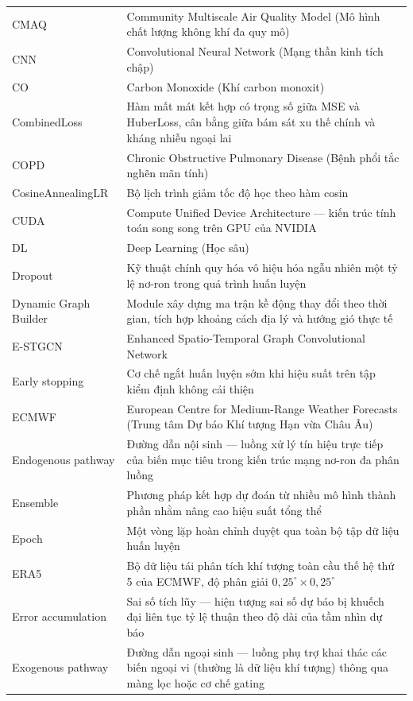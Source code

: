 \begin{longtable}{p{4.2cm} p{10.3cm}}
    CMAQ & Community Multiscale Air Quality Model (Mô hình chất lượng không khí đa quy mô) \\
    CNN & Convolutional Neural Network (Mạng thần kinh tích chập) \\
    CO & Carbon Monoxide (Khí carbon monoxit) \\
    CombinedLoss & Hàm mất mát kết hợp có trọng số giữa MSE và HuberLoss, cân bằng giữa bám sát xu thế chính và kháng nhiễu ngoại lai \\
    COPD & Chronic Obstructive Pulmonary Disease (Bệnh phổi tắc nghẽn mãn tính) \\
    CosineAnnealingLR & Bộ lịch trình giảm tốc độ học theo hàm cosin \\
    CUDA & Compute Unified Device Architecture --- kiến trúc tính toán song song trên GPU của NVIDIA \\
    DL & Deep Learning (Học sâu) \\
    Dropout & Kỹ thuật chính quy hóa vô hiệu hóa ngẫu nhiên một tỷ lệ nơ-ron trong quá trình huấn luyện \\
    Dynamic Graph Builder & Module xây dựng ma trận kề động thay đổi theo thời gian, tích hợp khoảng cách địa lý và hướng gió thực tế \\
    E-STGCN & Enhanced Spatio-Temporal Graph Convolutional Network \\
    Early stopping & Cơ chế ngắt huấn luyện sớm khi hiệu suất trên tập kiểm định không cải thiện \\
    ECMWF & European Centre for Medium-Range Weather Forecasts (Trung tâm Dự báo Khí tượng Hạn vừa Châu Âu) \\
    Endogenous pathway & Đường dẫn nội sinh --- luồng xử lý tín hiệu trực tiếp của biến mục tiêu trong kiến trúc mạng nơ-ron đa phân luồng \\
    Ensemble & Phương pháp kết hợp dự đoán từ nhiều mô hình thành phần nhằm nâng cao hiệu suất tổng thể \\
    Epoch & Một vòng lặp hoàn chỉnh duyệt qua toàn bộ tập dữ liệu huấn luyện \\
    ERA5 & Bộ dữ liệu tái phân tích khí tượng toàn cầu thế hệ thứ 5 của ECMWF, độ phân giải $0{,}25^\circ \times 0{,}25^\circ$ \\
    Error accumulation & Sai số tích lũy --- hiện tượng sai số dự báo bị khuếch đại liên tục tỷ lệ thuận theo độ dài của tầm nhìn dự báo \\
    Exogenous pathway & Đường dẫn ngoại sinh --- luồng phụ trợ khai thác các biến ngoại vi (thường là dữ liệu khí tượng) thông qua màng lọc hoặc cơ chế gating \\

\end{longtable}
